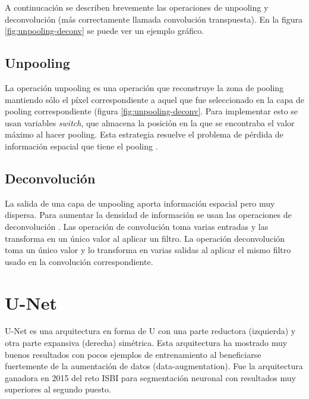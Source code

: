 
A continucación se describen brevemente las operaciones de unpooling y deconvolución (más correctamente llamada convolución transpuesta). En la figura \ref{fig:unpooling-deconv} \cite{Noh2015} se puede ver un ejemplo gráfico.

\subsection{Unpooling}\label{subsec:unpooling}

La operación unpooling es una operación que reconstruye la zona de pooling mantiendo sólo el píxel correspondiente a aquel que fue seleccionado en la capa de pooling correspondiente (figura \ref{fig:unpooling-deconv}. Para implementar esto se usan variables \textit{switch}, que almacena la posición en la que se encontraba el valor máximo al hacer pooling. Esta estrategia resuelve el problema de pérdida de información espacial que tiene el pooling \cite{Zeiler2011}.

\subsection{Deconvolución}\label{subsec:deconvolution}

La salida de una capa de unpooling aporta información espacial pero muy dispersa. Para aumentar la densidad de información se usan las operaciones de deconvolución \cite{Noh2015}. Las operación de convolución toma varias entradas y las transforma en un único valor al aplicar un filtro. La operación deconvolución toma un único valor y lo transforma en varias salidas al aplicar el mismo filtro usado en la convolución correspondiente.


\section{U-Net}\label{sec:unet}

U-Net es una arquitectura en forma de U con una parte reductora (izquierda) y otra parte expansiva (derecha) simétrica. Esta arquitectura ha mostrado muy buenos resultados con pocos ejemplos de entrenamiento al beneficiarse fuertemente de la aumentación de datos (data-augmentation)\cite{Ronneberger2015}. Fue la arquitectura ganadora en 2015 del reto ISBI para segmentación neuronal con resultados muy superiores al segundo puesto. 

